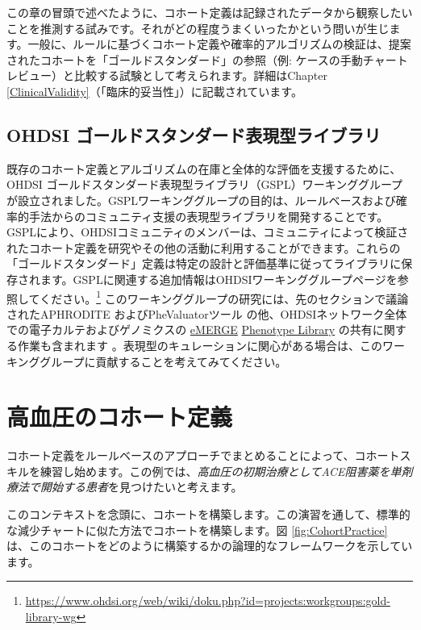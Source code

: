 \documentclass[
  11pt]{book}
\theoremstyle{definition}
\theoremstyle{definition}
\theoremstyle{definition}
\theoremstyle{definition}
\theoremstyle{remark}
\begin{document}
この章の冒頭で述べたように、コホート定義は記録されたデータから観察したいことを推測する試みです。それがどの程度うまくいったかという問いが生じます。一般に、ルールに基づくコホート定義や確率的アルゴリズムの検証は、提案されたコホートを「ゴールドスタンダード」の参照（例: ケースの手動チャートレビュー）と比較する試験として考えられます。詳細はChapter \ref{ClinicalValidity}（「臨床的妥当性」）に記載されています。

\subsection{OHDSI ゴールドスタンダード表現型ライブラリ}\label{ohdsi-ux30b4ux30fcux30ebux30c9ux30b9ux30bfux30f3ux30c0ux30fcux30c9ux8868ux73feux578bux30e9ux30a4ux30d6ux30e9ux30ea}

既存のコホート定義とアルゴリズムの在庫と全体的な評価を支援するために、OHDSI ゴールドスタンダード表現型ライブラリ（GSPL）ワーキンググループが設立されました。GSPLワーキンググループの目的は、ルールベースおよび確率的手法からのコミュニティ支援の表現型ライブラリを開発することです。GSPLにより、OHDSIコミュニティのメンバーは、コミュニティによって検証されたコホート定義を研究やその他の活動に利用することができます。これらの「ゴールドスタンダード」定義は特定の設計と評価基準に従ってライブラリに保存されます。GSPLに関連する追加情報はOHDSIワーキンググループページを参照してください。\footnote{\url{https://www.ohdsi.org/web/wiki/doku.php?id=projects:workgroups:gold-library-wg}} このワーキンググループの研究には、先のセクションで議論されたAPHRODITE \citep{Banda2017APHRODITE} およびPheValuatorツール \citep{Swerdel2019phevaluator} の他、OHDSIネットワーク全体での電子カルテおよびゲノミクスの \href{https://emerge.mc.vanderbilt.edu/}{eMERGE} \href{https://phekb.org/phenotypes}{Phenotype Library} の共有に関する作業も含まれます \citep{Hripcsak2019eMERGE}。表現型のキュレーションに関心がある場合は、このワーキンググループに貢献することを考えてみてください。 

\section{高血圧のコホート定義}\label{ux9ad8ux8840ux5727ux306eux30b3ux30dbux30fcux30c8ux5b9aux7fa9}

コホート定義をルールベースのアプローチでまとめることによって、コホートスキルを練習し始めます。この例では、\emph{高血圧の初期治療としてACE阻害薬を単剤療法で開始する患者}を見つけたいと考えます。

このコンテキストを念頭に、コホートを構築します。この演習を通して、標準的な減少チャートに似た方法でコホートを構築します。図 \ref{fig:CohortPractice} は、このコホートをどのように構築するかの論理的なフレームワークを示しています。
\end{document}
